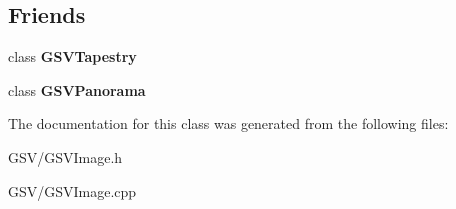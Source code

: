 \subsection*{Friends}
\begin{DoxyCompactItemize}
\item 
class {\bfseries G\+S\+V\+Tapestry}\hypertarget{class_g_s_v_image_a917257abed9ce3317f20f1c028782a36}{}\label{class_g_s_v_image_a917257abed9ce3317f20f1c028782a36}

\item 
class {\bfseries G\+S\+V\+Panorama}\hypertarget{class_g_s_v_image_ad99f63b35319b409bcda63da9239c706}{}\label{class_g_s_v_image_ad99f63b35319b409bcda63da9239c706}

\end{DoxyCompactItemize}


The documentation for this class was generated from the following files\+:\begin{DoxyCompactItemize}
\item 
G\+S\+V/G\+S\+V\+Image.\+h\item 
G\+S\+V/G\+S\+V\+Image.\+cpp\end{DoxyCompactItemize}
